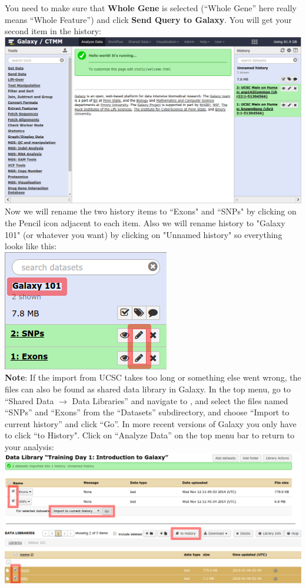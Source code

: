 \documentclass[11pt,a4paper]{article}
\begin{document}
You need to make sure that \textbf{Whole Gene} is selected (``Whole Gene'' here really means ``Whole Feature'') and click \textbf{Send Query to Galaxy}. You will get your second item in the history:\\
\includegraphics[width=\textwidth]{figures/101_08}\\
Now we will rename the two history items to ``Exons" and ``SNPs" by clicking on the Pencil icon adjacent to each item. Also we will rename history to "Galaxy 101" (or whatever you want) by clicking on "Unnamed history" so everything looks like this:\\
\includegraphics[scale=0.65]{figures/101_09}\\
\textbf{Note}: If the import from UCSC takes too long or something else went wrong, the files can also be found as shared data library in Galaxy. In the top menu, go to ``Shared Data $\rightarrow$ Data Libraries'' and navigate to \textit{\datalibrarydirintroduction}, and select the files named ``SNPs'' and ``Exons'' from the ``Datasets'' subdirectory, and choose ``Import to current history'' and click ``Go''. In more recent versions of Galaxy you only have to click ``to History". Click on ``Analyze Data'' on the top menu bar to return to your analysis:\\
\includegraphics[width=\textwidth]{figures/101_10}\\
\end{document}
